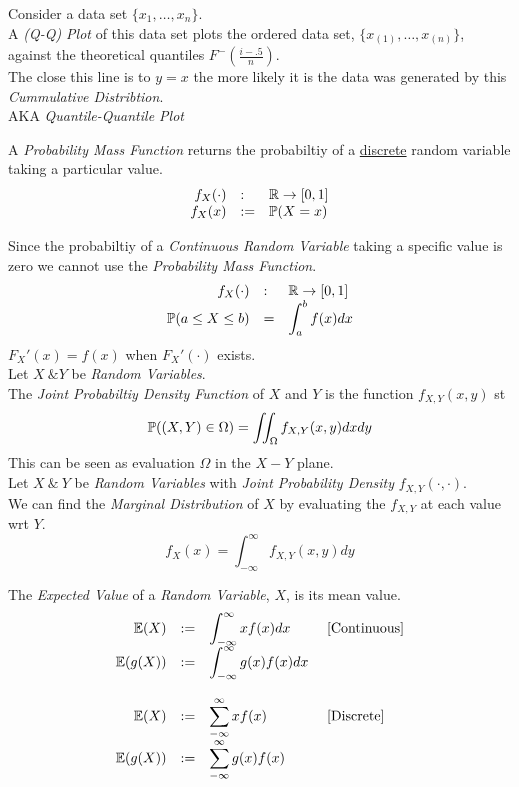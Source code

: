\documentclass[11pt,a4paper]{article}
\begin{document}
Consider a data set $\{x_1,\dots,x_n\}$.\\
A \textit{(Q-Q) Plot} of this data set plots the ordered data set, $\{x_{(1)},\dots,x_{(n)}\}$, against the theoretical quantiles $F^-\left(\frac{i-.5}n\right)$.\\
The close this line is to $y=x$ the more likely it is the data was generated by this \textit{Cummulative Distribtion}.\\
\nb AKA \textit{Quantile-Quantile Plot}

A \textit{Probability Mass Function} returns the probabiltiy of a \underline{discrete} random variable taking a particular value.
\[\begin{array}{rll}
f_X(\cdot)&:&\mathbb{R}\to[0,1]\\
f_X(x)&:=&\mathbb{P}(X=x)\\
\end{array}\]

Since the probabiltiy of a \textit{Continuous Random Variable} taking a specific value is zero we cannot use the \textit{Probability Mass Function}.
\[\begin{array}{rll}
f_X(\cdot)&:&\mathbb{R}\to[0,1]\\
\mathbb{P}(a\leq X\leq b)&=&\displaystyle\int_a^bf(x)dx
\end{array}\]
\nb $F_X'(x)=f(x)$ when $F_X'(\cdot)$ exists.\\

Let $X\ \& Y$ be \textit{Random Variables}.\\
The \textit{Joint Probabiltiy Density Function} of $X$ and $Y$ is the function $f_{X,Y}(x,y)$ st
$$\mathbb{P}((X,Y)\in\Omega)=\iint_\Omega f_{X,Y}(x,y)dxdy$$
\nb This can be seen as evaluation $\Omega$ in the $X-Y$ plane.\\

Let $X\ \&\ Y$ be \textit{Random Variables} with \textit{Joint Probability Density} $f_{X,Y}(\cdot,\cdot)$.\\
We can find the \textit{Marginal Distribution} of $X$ by evaluating the $f_{X,Y}$ at each value wrt $Y$.
$$f_X(x)=\int_{-\infty}^\infty f_{X,Y}(x,y)dy$$

The \textit{Expected Value} of a \textit{Random Variable}, $X$, is its mean value.
\[\begin{array}{rcll}
\mathbb{E}(X)&:=&\displaystyle\int_{-\infty}^\infty xf(x)dx&\text{ [Continuous]}\\
\mathbb{E}(g(X))&:=&\displaystyle\int_{-\infty}^\infty g(x)f(x)dx&\\\\
\mathbb{E}(X)&:=&\displaystyle\sum_{-\infty}^\infty xf(x)&\text{ [Discrete]}\\
\mathbb{E}(g(X))&:=&\displaystyle\sum_{-\infty}^\infty g(x)f(x)&
\end{array}\]
\end{document}
